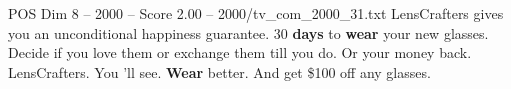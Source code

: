 \begin{textsample}{POS Dim 8 – 2000 – Score 2.00 – 2000/tv\_com\_2000\_31.txt}  \label{ex:f8_pos_032}
LensCrafters gives you an unconditional happiness guarantee. 30 \textbf{days} to \textbf{wear} your new glasses.
Decide if you love them or exchange them till you do.
Or your money back.
LensCrafters.
You 'll see. \textbf{Wear} better.
And get \$100 off any glasses.

\end{textsample}
